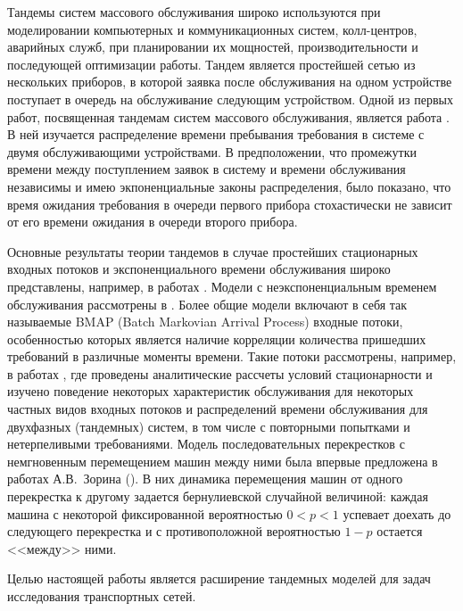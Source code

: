 \documentclass{report}
\begin{document}
Тандемы систем массового обслуживания широко используются при моделировании компьютерных и коммуникационных систем, колл-центров, аварийных служб, при планировании их мощностей, производительности и последующей оптимизации работы. 
Тандем является простейшей сетью из нескольких приборов, в которой заявка после обслуживания на одном устройстве  поступает в очередь на обслуживание следующим устройством.
Одной из первых работ, посвященная тандемам систем массового обслуживания, является работа \cite{Reich:1957}. В ней изучается распределение времени пребывания требования в системе с двумя обслуживающими устройствами. В предположении, что промежутки времени между поступлением заявок в систему и времени обслуживания независимы и имею экпоненциальные законы распределения, было показано, что время ожидания требования в очереди первого прибора стохастически не зависит от его времени ожидания в очереди второго прибора. 

Основные результаты теории тандемов в случае простейших стационарных входных потоков и экспоненциального времени обслуживания широко представлены, например, в работах \cite{Balsamo:2003, Gnedenko:Konig:1983, Perros:1994, Perros:1989}. Модели с неэкспоненциальным временем обслуживания рассмотрены в \cite{Gomez:2002:1, Gomez:2002:2, Gomez:2002:3}. Более общие модели включают в себя так называемые BMAP (Batch Markovian Arrival Process) входные потоки, особенностью которых является наличие корреляции количества пришедших требований в различные моменты времени. Такие потоки рассмотрены, например, в работах \cite{Klimenok:Dudin:2005,Klimenok:Dudin:2004, Klimenok:2010, Klimenok:2011, Klimenok:2015}, где проведены аналитические рассчеты условий стационарности и изучено поведение некоторых характеристик обслуживания для некоторых частных видов входных потоков и распределений времени обслуживания для двухфазных (тандемных) систем, в том числе с повторными попытками и нетерпеливыми требованиями. 
Модель последовательных перекрестков с немгновенным перемещением машин между ними была впервые предложена в работах А.В.~Зорина (\cite{Zorine:2010, Zorine:2011:2, Zorine:2012}). В них динамика перемещения машин от одного перекрестка к другому задается бернулиевской случайной величиной: каждая машина с некоторой фиксированной вероятностью $0<p<1$ успевает доехать до следующего перекрестка и с противоположной вероятностью $1-p$ остается <<между>> ними.

Целью настоящей работы является расширение тандемных моделей для задач исследования транспортных сетей. 
\end{document}
